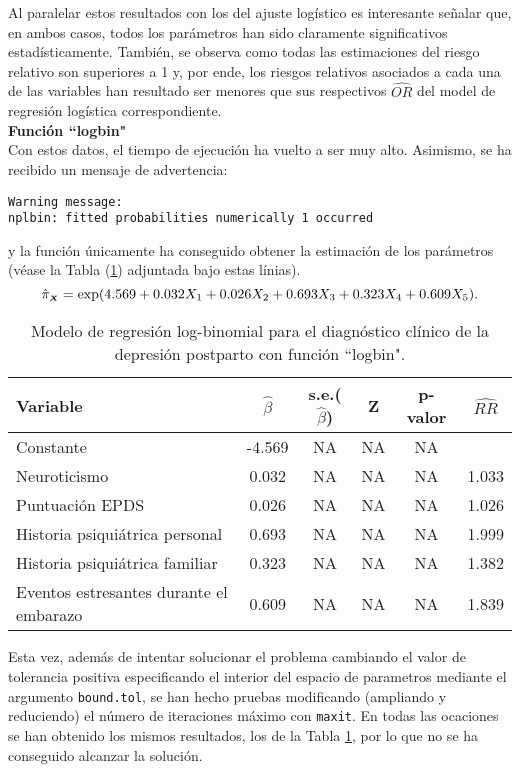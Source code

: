 Al paralelar estos resultados con los del ajuste logístico es interesante señalar que, en ambos casos, todos los parámetros han sido claramente significativos estadísticamente. También, se observa como todas las estimaciones del riesgo relativo son superiores a 1 y, por ende, los riesgos relativos asociados a cada una de las variables han resultado ser menores que sus respectivos $\widehat{OR}$ del model de regresión logística correspondiente.\\

\textbf{Función ``logbin"}\\
[0.3cm]
Con estos datos, el tiempo de ejecución ha vuelto a ser muy alto. Asimismo, se ha recibido un mensaje de advertencia:
\begin{Verbatim}[xleftmargin=2.5cm]
Warning message:
nplbin: fitted probabilities numerically 1 occurred 
\end{Verbatim}

y la función únicamente ha conseguido obtener la estimación de los parámetros (véase la Tabla (\ref{tab:16}) adjuntada bajo estas línias).
\begin{equation*}
\hat{\pi}_{\mathsmaller{\boldsymbol{X}}}=\exp(4.569+0.032X_1+0.026X_2+0.693X_3+0.323X_4+0.609X_5).
\end{equation*}

\begin{table} [H]
	\centering
	\begin{tabular}{l c c c c c}
		\toprule
		\textbf{Variable} & $\hat{\beta}$ & s.e.($\hat{\beta}$) & Z & p-valor & $\widehat{RR}$\\
		\midrule
		Constante &  -4.569 & NA & NA & NA &  \\
		Neuroticismo &   0.032  & NA & NA & NA &  1.033\\
		Puntuación EPDS & 0.026 & NA & NA & NA  & 1.026 \\
		Historia psiquiátrica personal &  0.693& NA & NA & NA   & 1.999 \\
		Historia psiquiátrica familiar & 0.323  & NA & NA & NA & 1.382\\
		Eventos estresantes durante el embarazo & 0.609   & NA & NA & NA  & 1.839\\
		\bottomrule
	\end{tabular}
	\caption{Modelo de regresión log-binomial para el diagnóstico clínico de la depresión postparto con función ``logbin".}
	\label{tab:16}
\end{table}

Esta vez, además de intentar solucionar el problema cambiando el valor de tolerancia positiva especificando el interior del espacio de parametros mediante el argumento \lstinline{bound.tol}, se han hecho pruebas modificando (ampliando y reduciendo) el número de iteraciones máximo con \lstinline{maxit}. En todas las ocaciones se han obtenido los mismos resultados, los de la Tabla \ref{tab:16}, por lo que no se ha conseguido alcanzar la solución. \\

